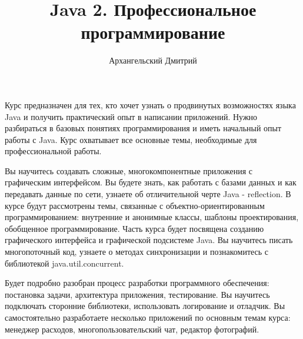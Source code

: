 \documentclass[a4paper,12pt]{article}
\title{Java 2. Профессиональное программирование}
\author{Архангельский Дмитрий}
\date{}
\begin{document}
\maketitle

Курс предназначен для тех, кто хочет узнать о продвинутых возможностях языка Java и получить практический опыт в написании приложений. Нужно разбираться в базовых понятиях программирования и иметь начальный опыт работы с Java. Курс охватывает все основные темы, необходимые для профессиональной работы.

Вы научитесь создавать сложные, многокомпонентные приложения с графическим интерфейсом. Вы будете знать, как работать с базами данных и как передавать данные по сети, узнаете об отличительной черте Java - reflection. В курсе будут рассмотрены темы, связанные с объектно-ориентированным программированием: внутренние и анонимные классы, шаблоны проектирования, обобщенное программирование. Часть курса будет посвящена созданию графического интерфейса и графической подсистеме Java. Вы научитесь писать многопоточный код, узнаете о методах синхронизации и познакомитесь с библиотекой java.util.concurrent. 

Будет подробно разобран процесс разработки программного обеспечения: постановка задачи, архитектура приложения, тестирование. Вы научитесь подключать сторонние библиотеки, использовать логирование и отладчик. Вы самостоятельно разработаете несколько приложений по основным темам курса: менеджер расходов, многопользовательский чат, редактор фотографий.
\end{document}
